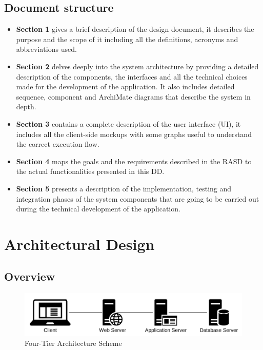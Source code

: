 \documentclass[table, 12pt]{article}
\begin{document}
\subsection{Document structure}
\begin{itemize}
    \item \textbf{Section 1} gives a brief description of the design document, it describes the purpose and the scope of it including all the definitions, acronyms and abbreviations used. 
    \item \textbf{Section 2} delves deeply into the system architecture by providing a detailed description of the components, the interfaces and all the technical choices made for the development of the application.
    It also includes detailed sequence, component and ArchiMate diagrams that describe the system in depth.
    \item \textbf{Section 3} contains a complete description of the user interface (UI), it includes all the client-side mockups with some graphs useful to understand the correct execution flow.
    \item \textbf{Section 4} maps the goals and the requirements described in the RASD to the actual functionalities presented in this DD.
    \item \textbf{Section 5} presents a description of the implementation, testing and integration phases of the system components that are going to be carried out during the technical development of the application.
\end{itemize}

\newpage
\section{Architectural Design}

\subsection{Overview}
\begin{center}
    \begin{figure}[H]
        \includegraphics[scale=0.55, center]{assets/4-tier-scheme.jpg}
        \caption{Four-Tier Architecture Scheme}
        \label{fig: four-tier-architecture-scheme}
    \end{figure}
\end{center}
\end{document}
